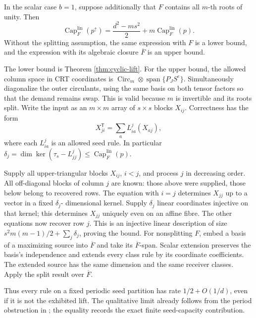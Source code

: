 \begin{theorem}\label{thm:periodic-capacity}
In the scalar case $b=1$, suppose additionally that $F$ contains all
$m$-th roots of unity. Then
\[
 \operatorname{Cap}^{\mathrm{lin}}_F(p^\uparrow)
 =\frac{d^2-ms^2}{2}+m\operatorname{Cap}^{\mathrm{lin}}_F(p).
\]
Without the splitting assumption, the same expression with $F$ is a lower
bound, and the expression with its algebraic closure $\overline F$ is an
upper bound.
\end{theorem}
\begin{outline}
The lower bound is Theorem \ref{thm:cyclic-lift}. For the upper bound,
the allowed column space in CRT coordinates is
$\operatorname{Circ}_m\otimes\operatorname{span}\{P_JS^e\}$.
Simultaneously diagonalize the outer circulants, using the same basis
on both tensor factors so that the demand remains swap. This is valid
because $m$ is invertible and its roots split. Write the input as an
$m\times m$ array of $s\times s$ blocks $X_{ij}$. Correctness has the form
\[
 X_{ji}^{\mathsf T}=\sum_a L_{ia}^j(X_{aj}),
\]
where each $L_{ia}^j$ is an allowed seed rule. In particular
$\delta_j=\dim\ker(\tau_s-L_{jj}^j)\le
\operatorname{Cap}^{\mathrm{lin}}_F(p)$.

Supply all upper-triangular blocks $X_{ij}$, $i<j$, and process $j$ in
decreasing order. All off-diagonal blocks of column $j$ are known: those
above were supplied, those below belong to recovered rows. The equation
with $i=j$ determines $X_{jj}$ up to a vector in a fixed $\delta_j$-
dimensional kernel. Supply $\delta_j$ linear coordinates injective on
that kernel; this determines $X_{jj}$ uniquely even on an affine fibre.
The other equations now recover row $j$. This is an injective linear
description of size $s^2m(m-1)/2+\sum_j\delta_j$, proving the bound.
For nonsplitting $F$, embed a basis of a maximizing source into
$\overline F$ and take its $\overline F$-span. Scalar extension preserves
the basis's independence and extends every class rule by its coordinate
coefficients. The extended source has the same dimension and the same
receiver classes. Apply the split result over $\overline F$.
\end{outline}

Thus every rule on a fixed periodic seed partition has rate
$1/2+O(1/d)$, even if it is not the exhibited lift. The qualitative limit
already follows from the period obstruction in \cite{SeventeenthPaper2026};
the equality records the exact finite seed-capacity contribution.


